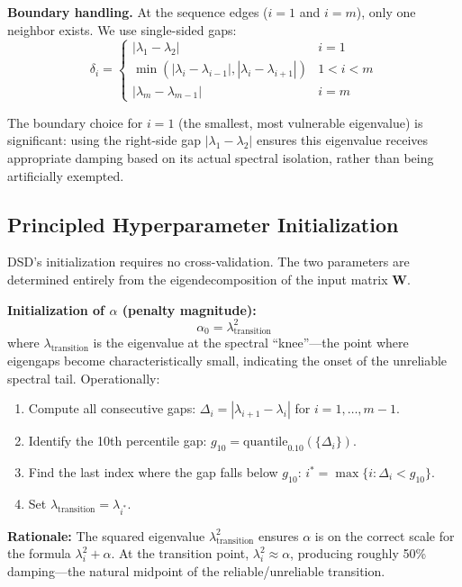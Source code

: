 \documentclass[journal]{IEEEtran}
\begin{document}
\textbf{Boundary handling.} At the sequence edges ($i{=}1$ and $i{=}m$), only one neighbor exists. We use single-sided gaps:
\begin{equation}
\delta_i = \begin{cases}
|\lambda_1 - \lambda_2| & i = 1 \\
\min(|\lambda_i - \lambda_{i-1}|, |\lambda_i - \lambda_{i+1}|) & 1 < i < m \\
|\lambda_m - \lambda_{m-1}| & i = m
\end{cases}
\label{eq:eigengap_boundary}
\end{equation}

The boundary choice for $i{=}1$ (the smallest, most vulnerable eigenvalue) is significant: using the right-side gap $|\lambda_1 - \lambda_2|$ ensures this eigenvalue receives appropriate damping based on its actual spectral isolation, rather than being artificially exempted.

\subsection{Principled Hyperparameter Initialization}
\label{sec:initialization}

DSD's initialization requires no cross-validation. The two parameters are determined entirely from the eigendecomposition of the input matrix $\bm{W}$.

\textbf{Initialization of $\alpha$ (penalty magnitude):}
\begin{equation}
\alpha_0 = \lambda_{\text{transition}}^2
\label{eq:alpha_init}
\end{equation}
where $\lambda_{\text{transition}}$ is the eigenvalue at the spectral ``knee''---the point where eigengaps become characteristically small, indicating the onset of the unreliable spectral tail. Operationally:
\begin{enumerate}
\item Compute all consecutive gaps: $\Delta_i = |\lambda_{i+1} - \lambda_i|$ for $i = 1, \ldots, m{-}1$.
\item Identify the 10th percentile gap: $g_{10} = \text{quantile}_{0.10}(\{\Delta_i\})$.
\item Find the last index where the gap falls below $g_{10}$: $i^* = \max\{i : \Delta_i < g_{10}\}$.
\item Set $\lambda_{\text{transition}} = \lambda_{i^*}$.
\end{enumerate}

\textbf{Rationale:} The squared eigenvalue $\lambda_{\text{transition}}^2$ ensures $\alpha$ is on the correct scale for the formula $\lambda_i^2 + \alpha$. At the transition point, $\lambda_i^2 \approx \alpha$, producing roughly 50\% damping---the natural midpoint of the reliable/unreliable transition.
\end{document}
